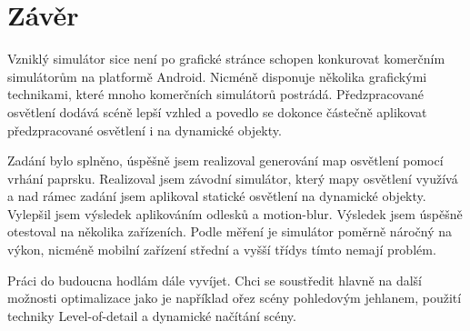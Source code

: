 \documentclass[11pt,twoside,a4paper]{book}
\begin{document}
\chapter{Závěr}
Vzniklý simulátor sice není po grafické stránce schopen konkurovat komerčním simulátorům na platformě Android. Nicméně disponuje několika grafickými technikami, které mnoho komerčních simulátorů postrádá. Předzpracované osvětlení dodává scéně lepší vzhled a povedlo se dokonce částečně aplikovat předzpracované osvětlení i na dynamické objekty.

Zadání bylo splněno, úspěšně jsem realizoval generování map osvětlení pomocí vrhání paprsku. Realizoval jsem závodní simulátor, který mapy osvětlení využívá a nad rámec zadání jsem aplikoval statické osvětlení na dynamické objekty. Vylepšil jsem výsledek aplikováním odlesků a motion-blur. Výsledek jsem úspěšně otestoval na několika zařízeních. Podle měření je simulátor poměrně náročný na výkon, nicméně mobilní zařízení střední a vyšší třídy\linebreak s tímto nemají problém.

Práci do budoucna hodlám dále vyvíjet. Chci se soustředit hlavně na další možnosti optimalizace jako je například ořez scény pohledovým jehlanem, použití techniky Level-of-detail a dynamické načítání scény.


%

%
%
{
\raggedright

}

%

\appendix
\end{document}
